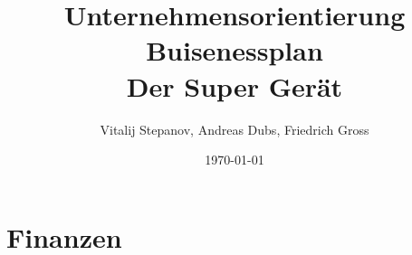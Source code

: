\documentclass[12pt,a4paper]{scrartcl}
\begin{document}
\title{Unternehmensorientierung\\
	  Buisenessplan\\
	  Der Super Gerät}
\author{Vitalij Stepanov, Andreas Dubs, Friedrich Gross}
\date{\today}
\maketitle
\tableofcontents
\newpage
\pagestyle{myheadings}
 








\section{Finanzen}
%
\end{document}
